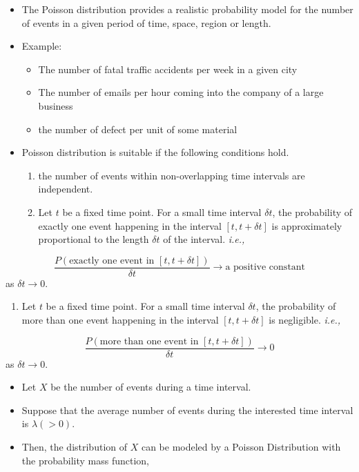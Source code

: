 \documentclass[]{book}
\providecommand{\tightlist}{%
  \setlength{\itemsep}{0pt}\setlength{\parskip}{0pt}}
\begin{document}
\begin{itemize}
\item
  The Poisson distribution provides a realistic probability model for the number of events in a given period of time, space, region or length.
\item
  Example:

  \begin{itemize}
  \tightlist
  \item
    The number of fatal traffic accidents per week in a given city
  \item
    The number of emails per hour coming into the company of a large business
  \item
    the number of defect per unit of some material
  \end{itemize}
\item
  Poisson distribution is suitable if the following conditions hold.

  \begin{enumerate}
  \def\labelenumi{\arabic{enumi}.}
  \tightlist
  \item
    the number of events within non-overlapping time intervals are independent.
  \item
    Let \(t\) be a fixed time point. For a small time interval \(\delta t\), the probability of exactly one event happening in the interval \([t,t+\delta t]\) is approximately proportional to the length \(\delta t\) of the interval. \emph{i.e.,}
  \end{enumerate}
\end{itemize}

\[\frac{P(\text{exactly one event in }[t,t+\delta t])}{\delta t} \to \text{a positive constant}\]
as \(\delta t \to 0.\)

\begin{enumerate}
\def\labelenumi{\arabic{enumi}.}
\setcounter{enumi}{2}
\tightlist
\item
  Let \(t\) be a fixed time point. For a small time interval \(\delta t\), the probability of more than one event happening in the interval \([t,t+\delta t]\) is negligible. \emph{i.e.,}
\end{enumerate}

\[\frac{P(\text{more than one event in }[t,t+\delta t])}{\delta t} \to 0\]
as \(\delta t \to 0.\)

\begin{itemize}
\tightlist
\item
  Let \(X\) be the number of events during a time interval.
\item
  Suppose that the average number of events during the interested time interval is \(\lambda (>0).\)
\item
  Then, the distribution of \(X\) can be modeled by a Poisson Distribution with the probability mass function,
\end{itemize}
\end{document}
